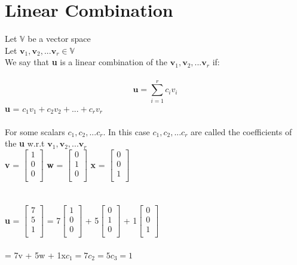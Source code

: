 \documentclass[12pt]{article}
\theoremstyle{definition}
\newcommand\tab[1][1.25cm]{\hspace*{#1}}
\begin{document}
\section{Linear Combination}
Let $\mathbb{V}$ be a vector space\\
Let $\textbf{v}_1, \textbf{v}_2,... \textbf{v}_r \in \mathbb{V}$\\
We say that \textbf{u} is a linear combination of the $\textbf{v}_1, \textbf{v}_2,... \textbf{v}_r$ if:\\\\
$$\textbf{u} =\sum_{i=1}^r c_i v_i$$ \textbf{u} = $c_1 v_1 + c_2 v_2+ ... + c_r v_r$\\
\\For some scalars $c_1, c_2,...c_r $. In this case $c_1, c_2,...c_r $ are called the coefficients of the \textbf{u} w.r.t $\textbf{v}_1, \textbf{v}_2,... \textbf{v}_r$\\
\textbf{v} = $\begin{bmatrix}
1\\
0\\
0\\
\end{bmatrix}$
\textbf{w} = $\begin{bmatrix}
0\\
1\\
0\\
\end{bmatrix}$
\textbf{x} = $\begin{bmatrix}
0\\
0\\
1\\
\end{bmatrix}$\\\\
\\\textbf{u} = $\begin{bmatrix}
7\\
5\\
1\\
\end{bmatrix}$ = 7$\begin{bmatrix}
1\\
0\\
0\\
\end{bmatrix}$ + 5$\begin{bmatrix}
0\\
1\\
0\\
\end{bmatrix}$ + 1$\begin{bmatrix}
0\\
0\\
1\\
\end{bmatrix}$\\
\\\tab = 7v + 5w + 1x\tab\tab\tab $c_1 = 7$\tab$c_2 = 5$\tab$c_3 = 1$
\end{document}
